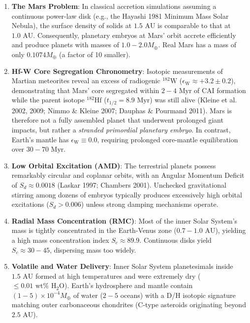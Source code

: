 \documentclass[11pt,a4paper]{article}
\begin{document}
\begin{enumerate}
    \item \textbf{The Mars Problem}: In classical accretion simulations assuming a continuous power-law disk (e.g., the Hayashi 1981 Minimum Mass Solar Nebula), the surface density of solids at $1.5\text{ AU}$ is comparable to that at $1.0\text{ AU}$. Consequently, planetary embryos at Mars' orbit accrete efficiently and produce planets with masses of $1.0-2.0 M_\oplus$. Real Mars has a mass of only $0.1074 M_\oplus$ (a factor of 10 smaller).
    \item \textbf{Hf-W Core Segregation Chronometry}: Isotopic measurements of Martian meteorites reveal an excess of radiogenic $^{182}\text{W}$ ($\epsilon_{\text{W}} \approx +3.2 \pm 0.2$), demonstrating that Mars' core segregated within $2-4\text{ Myr}$ of CAI formation while the parent isotope $^{182}\text{Hf}$ ($t_{1/2} = 8.9\text{ Myr}$) was still alive (Kleine et al. 2002, 2009; Nimmo \& Kleine 2007; Dauphas \& Pourmand 2011). Mars is therefore not a fully assembled planet that underwent prolonged giant impacts, but rather a \textit{stranded primordial planetary embryo}. In contrast, Earth's mantle has $\epsilon_{\text{W}} \equiv 0.0$, requiring prolonged core-mantle equilibration over $30-70\text{ Myr}$.
    \item \textbf{Low Orbital Excitation (AMD)}: The terrestrial planets possess remarkably circular and coplanar orbits, with an Angular Momentum Deficit of $S_d \approx 0.0018$ (Laskar 1997; Chambers 2001). Unchecked gravitational stirring among dozens of embryos typically produces excessively high orbital excitations ($S_d > 0.006$) unless strong damping mechanisms operate.
    \item \textbf{Radial Mass Concentration (RMC)}: Most of the inner Solar System's mass is tightly concentrated in the Earth-Venus zone ($0.7-1.0\text{ AU}$), yielding a high mass concentration index $S_c \approx 89.9$. Continuous disks yield $S_c \approx 30-45$, dispersing mass too widely.
    \item \textbf{Volatile and Water Delivery}: Inner Solar System planetesimals inside $1.5\text{ AU}$ formed at high temperatures and were extremely dry ($\le 0.01\text{ wt}\%\text{ H}_2\text{O}$). Earth's hydrosphere and mantle contain $(1-5) \times 10^{-4} M_\oplus$ of water ($2-5$ oceans) with a D/H isotopic signature matching outer carbonaceous chondrites (C-type asteroids originating beyond $2.5\text{ AU}$).
\end{enumerate}
\end{document}

